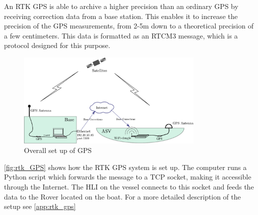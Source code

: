 An RTK GPS is able to archive a higher precision than an ordinary GPS by receiving correction data from a base station.
This enables it to increase the precision of the GPS measurements, from 2-5m down to a theoretical precision of a few centimeters.
This data is formatted as an RTCM3 message, which is a protocol designed for this purpose.
\begin{figure}[H]
	\includegraphics[width=0.8\textwidth]{figures/comunicationSetup.pdf}
	\caption{Overall set up of GPS}
	\label{fig:rtk_GPS}
\end{figure}
\autoref{fig:rtk_GPS} shows how the RTK GPS system is set up. 
The computer runs a Python script which forwards the message to a TCP socket, making it accessible through the Internet. 
The HLI on the vessel connects to this socket and feeds the data to the Rover located on the boat.
For a more detailed description of the setup see \autoref{app:rtk_gps}
